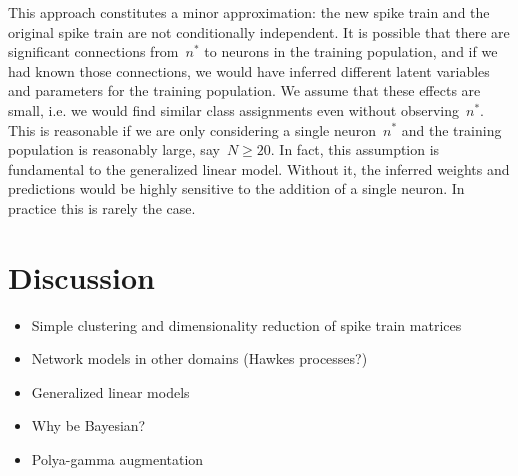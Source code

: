 This approach constitutes a minor approximation:
the new spike train and the original spike train are not
conditionally independent. It is possible that there are
significant connections from~$n^*$ to neurons in the training
population, and if we had known those connections, we would
have inferred different latent variables and parameters for
the training population. We assume that these effects are small,
i.e. we would find similar class assignments even without observing~$n^*$.
This is reasonable if we are only considering a single neuron~$n^*$
and the training population is reasonably large, say~$N \geq 20$.
In fact, this assumption is fundamental to the generalized
linear model. Without it, the inferred weights and predictions
would be highly sensitive to the addition of a single neuron.
In practice this is rarely the case.


\section{Discussion}
\begin{itemize}
\item Simple clustering and dimensionality reduction of spike train matrices
\item Network models in other domains (Hawkes processes?)
\item Generalized linear models
\item Why be Bayesian?
\item Polya-gamma augmentation
\end{itemize}

